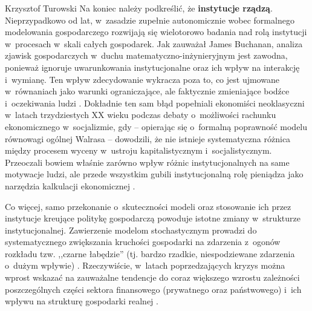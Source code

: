 \begin{artplenv}{Krzysztof Turowski}
Na koniec należy podkreślić, że \textbf{instytucje rządzą}. Nieprzypadkowo od lat, w~zasadzie zupełnie autonomicznie
wobec formalnego modelowania gospodarczego rozwijają się wielotorowo badania nad rolą instytucji w~procesach w~skali
całych gospodarek. Jak zauważał James Buchanan, analiza zjawisk gospodarczych w~duchu matematyczno-inżynieryjnym jest
zawodna, ponieważ ignoruje uwarunkowania instytucjonalne oraz ich wpływ na interakcję i~wymianę. Ten wpływ zdecydowanie
wykracza poza to, co jest ujmowane w~równaniach jako warunki ograniczające, ale faktycznie zmieniające
bodźce i~oczekiwania ludzi
\parencite{buchanan_economists_2009}.
Dokładnie ten sam błąd popełniali ekonomiści neoklasyczni
w~latach trzydziestych XX wieku podczas debaty o~możliwości rachunku ekonomicznego w~socjalizmie, gdy  --  opierając się o~formalną
poprawność modelu równowagi ogólnej Walrasa  --  dowodzili, że nie istnieje systematyczna różnica między procesem
wyceny w~ustroju kapitalistycznym i~socjalistycznym. Przeoczali bowiem właśnie zarówno wpływ różnic instytucjonalnych
na same motywacje ludzi, ale przede wszystkim gubili instytucjonalną rolę pieniądza jako narzędzia kalkulacji
ekonomicznej
\parencite{mises_ludzkie_2007,mises_kalkulacja_2011}.

Co więcej, samo przekonanie o~skuteczności modeli oraz stosowanie ich przez instytucje kreujące politykę gospodarczą
powoduje istotne zmiany w~strukturze instytucjonalnej. Zawierzenie modelom stochastycznym prowadzi do systematycznego
zwiększania kruchości gospodarki na zdarzenia z~ogonów rozkładu tzw. ,,czarne łabędzie'' (tj. bardzo rzadkie,
niespodziewane zdarzenia o~dużym wpływie)
\parencite{taleb_antykruchosc:_2013}.
Rzeczywiście, w~latach poprzedzających
kryzys można wprost wskazać na zauważalne tendencje do coraz większego wzrostu zależności poszczególnych części
sektora finansowego (prywatnego oraz państwowego) i~ich wpływu na strukturę gospodarki realnej
\parencite{jablecki_financial_2016}.


\end{artplenv}
